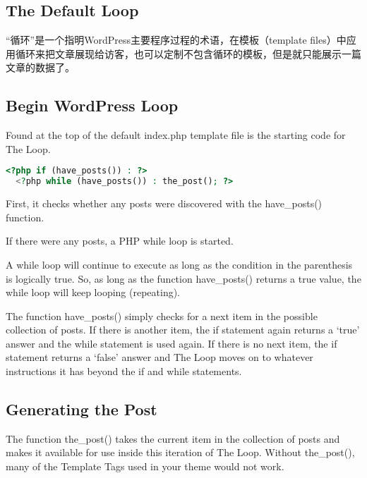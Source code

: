 \subsection{The Default Loop}

“循环”是一个指明WordPress主要程序过程的术语，在模板（template files）中应用循环来把文章展现给访客，也可以定制不包含循环的模板，但是就只能展示一篇文章的数据了。

\subsection{Begin WordPress Loop}

Found at the top of the default index.php template file is the starting code for The Loop.



\begin{lstlisting}[language=PHP]
<?php if (have_posts()) : ?>
  <?php while (have_posts()) : the_post(); ?>
\end{lstlisting}

\begin{compactenum}
\item First, it checks whether any posts were discovered with the have\_posts() function.
\item If there were any posts, a PHP while loop is started. 
\end{compactenum}

A while loop will continue to execute as long as the condition in the parenthesis is logically true. So, as long as the function have\_posts() returns a true value, the while loop will keep looping (repeating). 

The function have\_posts() simply checks for a next item in the possible collection of posts. If there is another item, the if statement again returns a `true' answer and the while statement is used again. If there is no next item, the if statement returns a `false' answer and The Loop moves on to whatever instructions it has beyond the if and while statements.



\subsection{Generating the Post}

The function the\_post() takes the current item in the collection of posts and makes it available for use inside this iteration of The Loop. Without the\_post(), many of the Template Tags used in your theme would not work.

